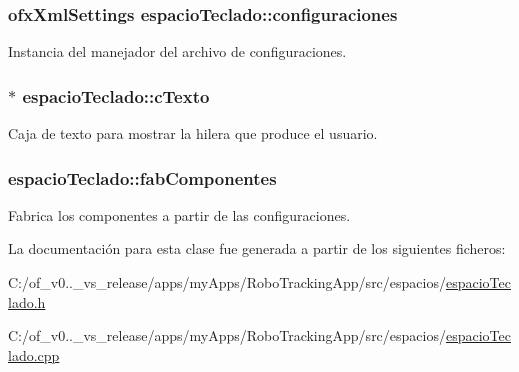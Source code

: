 \subsubsection[{configuraciones}]{\setlength{\rightskip}{0pt plus 5cm}ofx\+Xml\+Settings espacio\+Teclado\+::configuraciones\hspace{0.3cm}{\ttfamily [private]}}\label{classespacio_teclado_af215829331b2ed6d0a4485eab2a37311}


Instancia del manejador del archivo de configuraciones. 

\hypertarget{classespacio_teclado_ac4d882599a627a2d26aa19280fb1cf28}{}
\subsubsection[{c\+Texto}]{$\ast$ espacio\+Teclado\+::c\+Texto\hspace{0.3cm}{\ttfamily [private]}}\label{classespacio_teclado_ac4d882599a627a2d26aa19280fb1cf28}


Caja de texto para mostrar la hilera que produce el usuario. 

\hypertarget{classespacio_teclado_aaa53bfd0abe00de252f38c299174f0d1}{}
\subsubsection[{fab\+Componentes}]{ espacio\+Teclado\+::fab\+Componentes\hspace{0.3cm}{\ttfamily [private]}}\label{classespacio_teclado_aaa53bfd0abe00de252f38c299174f0d1}


Fabrica los componentes a partir de las configuraciones. 



La documentación para esta clase fue generada a partir de los siguientes ficheros\+:\begin{DoxyCompactItemize}
\item 
C\+:/of\+\_\+v0..\+\_\+vs\+\_\+release/apps/my\+Apps/\+Robo\+Tracking\+App/src/espacios/\hyperlink{espacio_teclado_8h}{espacio\+Teclado.\+h}\item 
C\+:/of\+\_\+v0..\+\_\+vs\+\_\+release/apps/my\+Apps/\+Robo\+Tracking\+App/src/espacios/\hyperlink{espacio_teclado_8cpp}{espacio\+Teclado.\+cpp}\end{DoxyCompactItemize}
